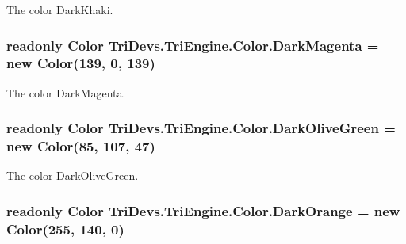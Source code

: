 The color Dark\-Khaki. 

\hypertarget{struct_tri_devs_1_1_tri_engine_1_1_color_a752b6dab067b6ad2b2566fcd4cd41488}{
\subsubsection[{Dark\-Magenta}]{\setlength{\rightskip}{0pt plus 5cm}readonly {\bf Color} Tri\-Devs.\-Tri\-Engine.\-Color.\-Dark\-Magenta = new {\bf Color}(139, 0, 139)\hspace{0.3cm}{\ttfamily [static]}}}\label{struct_tri_devs_1_1_tri_engine_1_1_color_a752b6dab067b6ad2b2566fcd4cd41488}


The color Dark\-Magenta. 

\hypertarget{struct_tri_devs_1_1_tri_engine_1_1_color_a6179dc097d9934cd1757d19e16ac2e2b}{
\subsubsection[{Dark\-Olive\-Green}]{\setlength{\rightskip}{0pt plus 5cm}readonly {\bf Color} Tri\-Devs.\-Tri\-Engine.\-Color.\-Dark\-Olive\-Green = new {\bf Color}(85, 107, 47)\hspace{0.3cm}{\ttfamily [static]}}}\label{struct_tri_devs_1_1_tri_engine_1_1_color_a6179dc097d9934cd1757d19e16ac2e2b}


The color Dark\-Olive\-Green. 

\hypertarget{struct_tri_devs_1_1_tri_engine_1_1_color_a8559890ec55a418bc112090a8423e087}{
\subsubsection[{Dark\-Orange}]{\setlength{\rightskip}{0pt plus 5cm}readonly {\bf Color} Tri\-Devs.\-Tri\-Engine.\-Color.\-Dark\-Orange = new {\bf Color}(255, 140, 0)\hspace{0.3cm}{\ttfamily [static]}}}\label{struct_tri_devs_1_1_tri_engine_1_1_color_a8559890ec55a418bc112090a8423e087}


